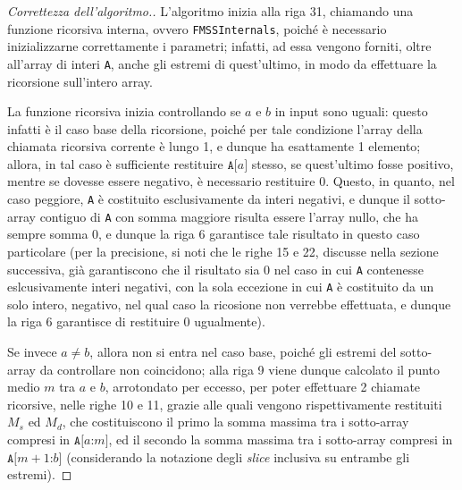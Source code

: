 \documentclass[a4paper, 12pt]{report}
\begin{document}
    \begin{proof}[Correttezza dell'algoritmo.]
        L'algoritmo inizia alla riga 31, chiamando una funzione ricorsiva interna, ovvero \texttt{FMSSInternals}, poiché è necessario inizializzarne correttamente i parametri; infatti, ad essa vengono forniti, oltre all'array di interi \texttt{A}, anche gli estremi di quest'ultimo, in modo da effettuare la ricorsione sull'intero array.

        La funzione ricorsiva inizia controllando se $a$ e $b$ in input sono uguali: questo infatti è il caso base della ricorsione, poiché per tale condizione l'array della chiamata ricorsiva corrente è lungo 1, e dunque ha esattamente 1 elemento; allora, in tal caso è sufficiente restituire $\texttt{A[}a\texttt{]}$ stesso, se quest'ultimo fosse positivo, mentre se dovesse essere negativo, è necessario restituire 0. Questo, in quanto, nel caso peggiore, \texttt{A} è costituito esclusivamente da interi negativi, e dunque il sotto-array contiguo di \texttt{A} con somma maggiore risulta essere l'array nullo, che ha sempre somma 0, e dunque la riga 6 garantisce tale risultato in questo caso particolare (per la precisione, si noti che le righe 15 e 22, discusse nella sezione successiva, già garantiscono che il risultato sia 0 nel caso in cui \texttt{A} contenesse eslcusivamente interi negativi, con la sola eccezione in cui \texttt{A} è costituito da un solo intero, negativo, nel qual caso la ricosione non verrebbe effettuata, e dunque la riga 6 garantisce di restituire 0 ugualmente).

        Se invece $a \neq b$, allora non si entra nel caso base, poiché gli estremi del sotto-array da controllare non coincidono; alla riga 9 viene dunque calcolato il punto medio $m$ tra $a$ e $b$, arrotondato per eccesso, per poter effettuare 2 chiamate ricorsive, nelle righe 10 e 11, grazie alle quali vengono rispettivamente restituiti $M_s$ ed $M_d$, che costituiscono il primo la somma massima tra i sotto-array compresi in $\texttt{A[}a\texttt{:}m\texttt{]}$, ed il secondo la somma massima tra i sotto-array compresi in $\texttt{A[}m + 1\texttt{:}b\texttt{]}$ (considerando la notazione degli \textit{slice} inclusiva su entrambe gli estremi).


\end{proof}
\end{document}
